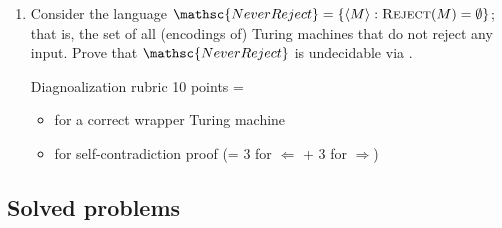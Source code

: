 \documentclass[11pt]{article}
\begin{document}
\begin{enumerate}
\item 
Consider the language $\mathsc{NeverReject} = \{ \langle M \rangle :
\textsc{Reject}(M) = \emptyset \}$; that is, the set of all (encodings of)
Turing machines that do not reject any input. 
Prove that $\mathsc{NeverReject}$ is undecidable via .
\begin{Rubric}{Diagnoalization rubric}
10 points =
\begin{itemize}
\item[+ 4] for a correct wrapper Turing machine
\item[+ 6] for self-contradiction proof (= 3 for $\Longleftarrow$ + 3 for $\Longrightarrow$)
\end{itemize}
\end{Rubric}

\end{enumerate}


\newpage

\subsection*{Solved problems}
\end{document}
